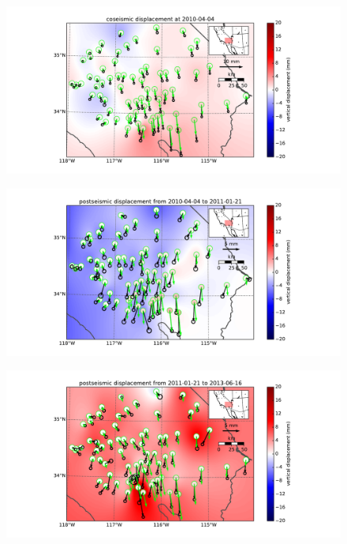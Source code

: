 \documentclass[12pt]{article}
\begin{document}
\begin{figure}
\includegraphics[scale=0.6,resolution=10]{Figures/far_field_data_1}
\centering 
\caption{}
\label{fig:FarField1}
\end{figure}
\begin{figure}
\includegraphics[scale=0.6,resolution=10]{Figures/far_field_data_2}
\centering 
\caption{}
\label{fig:FarField2}
\end{figure}
\begin{figure}
\includegraphics[scale=0.6,resolution=10]{Figures/far_field_data_3}
\centering 
\caption{}
\label{fig:FarField3}
\end{figure}
\end{document}
